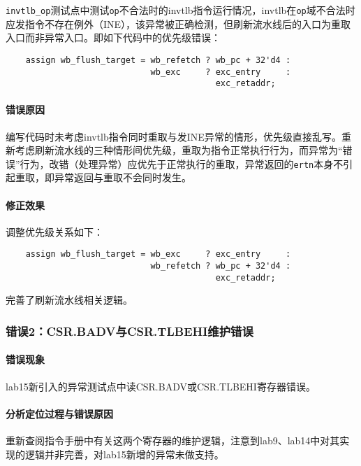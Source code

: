 \documentclass[UTF-8,twoside,c5size]{ctexart}
\begin{document}
    \texttt{invtlb\_op}测试点中测试\texttt{op}不合法时的invtlb指令运行情况，invtlb在\texttt{op}域不合法时应发指令不存在例外（INE），该异常被正确检测，但刷新流水线后的入口为重取入口而非异常入口。即如下代码中的优先级错误：
    \begin{verbatim}
    assign wb_flush_target = wb_refetch ? wb_pc + 32'd4 :
                             wb_exc     ? exc_entry     :
                                          exc_retaddr;
    \end{verbatim}
    
    \paragraph{错误原因}\hfill
    
    编写代码时未考虑invtlb指令同时重取与发INE异常的情形，优先级直接乱写。重新考虑刷新流水线的三种情形间优先级，重取为指令正常执行行为，而异常为“错误”行为，改错（处理异常）应优先于正常执行的重取，异常返回的\texttt{ertn}本身不引起重取，即异常返回与重取不会同时发生。
    
    \paragraph{修正效果}\hfill
    
    调整优先级关系如下：
    \begin{verbatim}
    assign wb_flush_target = wb_exc     ? exc_entry     :
                             wb_refetch ? wb_pc + 32'd4 :
                                          exc_retaddr;
    \end{verbatim}
    完善了刷新流水线相关逻辑。
    
    \subsubsection{错误\textbf{2：}\textbf{CSR.BADV}与\textbf{CSR.TLBEHI}维护错误}
    \paragraph{错误现象}\hfill
    
    lab15新引入的异常测试点中读CSR.BADV或CSR.TLBEHI寄存器错误。
    
    \paragraph{分析定位过程与错误原因}\hfill
    
    重新查阅指令手册中有关这两个寄存器的维护逻辑，注意到lab9、lab14中对其实现的逻辑并非完善，对lab15新增的异常未做支持。
    
\end{document}
